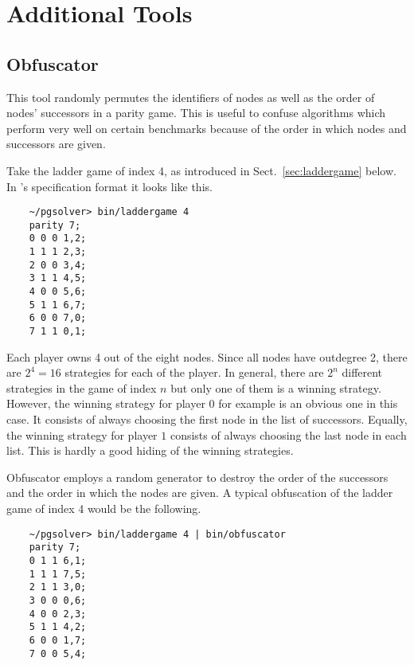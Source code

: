 \section{Additional Tools}
\label{sec:tools}

\subsection{Obfuscator}

This tool randomly permutes the identifiers of nodes as well as the order
of nodes' successors in a parity game. This is useful to confuse algorithms
which perform very well on certain benchmarks because of the order in which
nodes and successors are given.

\begin{example}
Take the ladder game of index 4, as introduced in Sect.~\ref{sec:laddergame}
below. In \pgsolver's specification format it looks like this.
\begin{verbatim}
    ~/pgsolver> bin/laddergame 4
    parity 7;
    0 0 0 1,2;
    1 1 1 2,3;
    2 0 0 3,4;
    3 1 1 4,5;
    4 0 0 5,6;
    5 1 1 6,7;
    6 0 0 7,0;
    7 1 1 0,1;
\end{verbatim}
Each player owns 4 out of the eight nodes. Since all nodes have outdegree 2, there
are $2^4 = 16$ strategies for each of the player. In general, there are $2^n$
different strategies in the game of index $n$ but only one of them is
a winning strategy. However, the winning strategy for player $0$ for example is
an obvious one in this case. It consists of always choosing the first node in the
list of successors. Equally, the winning strategy for player $1$ consists of always
choosing the last node in each list. This is hardly a good hiding of the winning
strategies.

Obfuscator employs a random generator to destroy the order of the successors and
the order in which the nodes are given. A typical obfuscation of the ladder game of
index 4 would be the following.
\begin{verbatim}
    ~/pgsolver> bin/laddergame 4 | bin/obfuscator
    parity 7;
    0 1 1 6,1;
    1 1 1 7,5;
    2 1 1 3,0;
    3 0 0 0,6;
    4 0 0 2,3;
    5 1 1 4,2;
    6 0 0 1,7;
    7 0 0 5,4;
\end{verbatim}
\end{example}

